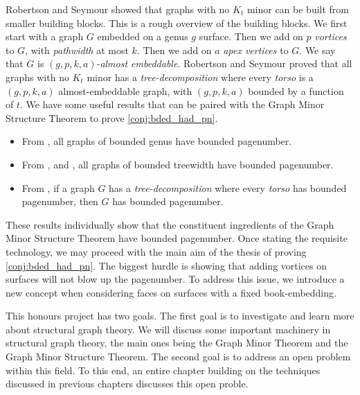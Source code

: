 Robertson and Seymour showed that graphs with no \(K_t\) minor can be built from smaller building blocks. This is a rough overview of the building blocks. We first start with a graph \(G\) embedded on a genus \(g\) surface. Then we add on \(p\) \textit{vortices} to \(G\), with \textit{pathwidth} at most \(k\). Then we add on \(a\) \textit{apex vertices} to \(G\). We say that \(G\) is \((g, p, k, a)\)-\textit{almost embeddable}. Robertson and Seymour \cite{robertsonGraphMinorsXVI2003} proved that all graphs with no \(K_t\) minor has a \textit{tree-decomposition} where every \textit{torso} is a \((g, p, k, a)\) almost-embeddable graph, with \((g, p, k, a)\) bounded by a function of \(t\).
We have some useful results that can be paired with the Graph Minor Structure Theorem to prove \cref{conj:bded_had_pn}.
\begin{itemize}
	\item From \textcite{heathPagenumberGenusGraphs1992}, all graphs of bounded genus have bounded pagenumber.
	\item From \textcite{ganleyPagenumberTrees2001}, and \textcite{dujmovicGraphTreewidthGeometric2007}, all graphs of bounded treewidth have bounded pagenumber.
	\item From \textcite{hickingbothamStackNumberCliqueSum2023}, if a graph \(G\) has a \textit{tree-decomposition} where every \textit{torso} has bounded pagenumber, then \(G\) has bounded pagenumber.
\end{itemize}
These results individually show that the constituent ingredients of the Graph Minor Structure Theorem have bounded pagenumber. Once stating the requisite technology, we may proceed with the main aim of the thesis of proving \cref{conj:bded_had_pn}. 
The biggest hurdle is showing that adding vortices on surfaces will not blow up the pagenumber. To address this issue, we introduce a new concept when considering faces on surfaces with a fixed book-embedding. 

This honours project has two goals. The first goal is to investigate and learn more about structural graph theory. We will discuss some important machinery in structural graph theory, the main ones being the Graph Minor Theorem and the Graph Minor Structure Theorem. The second goal is to address an open problem within this field. To this end, an entire chapter building on the techniques discussed in previous chapters discusses this open proble. 


